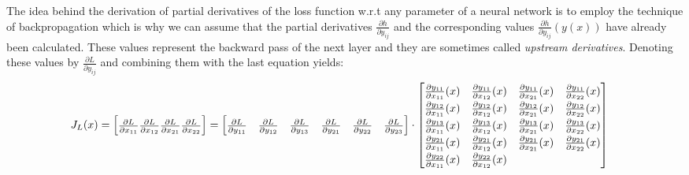 \documentclass{article}
\begin{document}
\vspace{0.2cm}
\noindent 
The idea behind the derivation of partial derivatives of the loss function w.r.t any parameter 
of a neural network is to employ the technique of backpropagation which is why we can assume
that the partial derivatives \(\frac{\partial h}{\partial y_{ij}}\) and the corresponding values
\(\frac{\partial h}{\partial y_{ij}}(y(x))\) have already been calculated. 
These values represent the backward pass of the next layer and they are sometimes called 
\textit{upstream derivatives}. Denoting these values by \(\frac{\partial L}{\partial y_{ij}}\)
and combining them with the last equation yields:
\setlength{\arraycolsep}{1.3pt}
\begin{align*}
        J_{L}(x) = 
        \begin{bmatrix}
            \frac{\partial L}{\partial x_{11}} \frac{\partial L}{\partial x_{12}} 
            \frac{\partial L}{\partial x_{21}} \frac{\partial L}{\partial x_{22}}
        \end{bmatrix} &=
        \begin{bmatrix}
            \frac{\partial L}{\partial y_{11}} & \frac{\partial L}{\partial y_{12}} & 
            \frac{\partial L}{\partial y_{13}} & \frac{\partial L}{\partial y_{21}} & 
            \frac{\partial L}{\partial y_{22}} & \frac{\partial L}{\partial y_{23}}
        \end{bmatrix} \cdot
        \renewcommand{\arraystretch}{1.3}
        \begin{bmatrix}
            \frac{\partial y_{11}}{\partial x_{11}}(x) & \frac{\partial y_{11}}{\partial x_{12}}(x) &
            \frac{\partial y_{11}}{\partial x_{21}}(x) & \frac{\partial y_{11}}{\partial x_{22}}(x) \\
            \frac{\partial y_{12}}{\partial x_{11}}(x) & \frac{\partial y_{12}}{\partial x_{12}}(x) &
            \frac{\partial y_{12}}{\partial x_{21}}(x) & \frac{\partial y_{12}}{\partial x_{22}}(x) \\
            \frac{\partial y_{13}}{\partial x_{11}}(x) & \frac{\partial y_{13}}{\partial x_{12}}(x) &
            \frac{\partial y_{13}}{\partial x_{21}}(x) & \frac{\partial y_{13}}{\partial x_{22}}(x) \\
            \frac{\partial y_{21}}{\partial x_{11}}(x) & \frac{\partial y_{21}}{\partial x_{12}}(x) &
            \frac{\partial y_{21}}{\partial x_{21}}(x) & \frac{\partial y_{21}}{\partial x_{22}}(x) \\
            \frac{\partial y_{22}}{\partial x_{11}}(x) & \frac{\partial y_{22}}{\partial x_{12}}(x) &

\end{bmatrix}
\end{align*}
\end{document}
